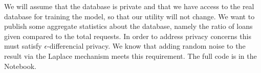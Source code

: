 \documentclass{amsart}
\begin{document}
	We will assume that the database is private and that we have access to the real database for training the model, so that our utility will not change. We want to publish some aggregate statistics about the database, namely the ratio of loans given compared to the total requests. In order to address privacy concerns this must satisfy $\epsilon$-differencial privacy. We know that adding random noise to the result via the Laplace mechanism meets this requirement. The full code is in the Notebook.
\end{document}

